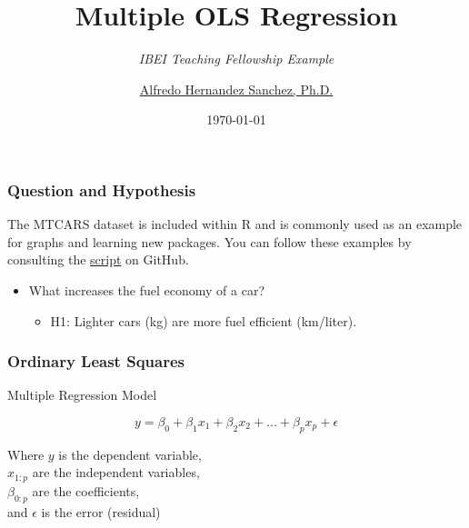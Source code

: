 \documentclass[aspectratio=169]{beamer}
\title{\color{maroon} Multiple OLS Regression}
\subtitle{\textit{\color{maroon} IBEI Teaching Fellowship Example}}
\author{\href{https://alhdzsz.netlify.com/}{Alfredo Hernandez Sanchez, Ph.D.}}
\institute{\href{https://www.ibei.org/en}{Barcelona Institute of International Studies}}
\date{\today}
\begin{document}
\maketitle

\begin{frame}
\frametitle{Question and Hypothesis}

\begin{tcolorbox}[colframe=maroon,title=Example Code]
The MTCARS dataset is included within R and is commonly used as an example for graphs and learning new packages. You can follow these examples by consulting the \href{https://github.com/alhdzsz/IBEI-Example/blob/master/cars_script.R}{script} on GitHub. 
\end{tcolorbox}
\Large
\vspace{.5cm}
\begin{itemize}
    \item What increases the fuel economy of a car?
    \begin{itemize}
        \item H1: Lighter cars (kg) are more fuel efficient (km/liter).
    \end{itemize}
\end{itemize}


\end{frame}


\begin{frame}
\frametitle{Ordinary Least Squares}

\begin{center}
    Multiple Regression Model
\end{center}
\Large
\begin{equation}
y = \beta_{0} + \beta_{1}x_{1} + \beta_{2}x_{2} + ... + \beta_{p}x_{p} + \epsilon
\end{equation}

\vspace{.5cm}
\normalsize
\noindent Where $y$ is the dependent variable, \\
$x_{1:p}$ are the independent variables, \\  
$\beta_{0:p}$ are the coefficients, \\
and $\epsilon$ is the error (residual)

\end{frame}
\end{document}
